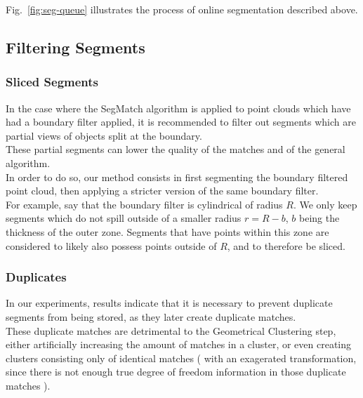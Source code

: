 Fig.~\ref{fig:seg-queue} illustrates the process of online segmentation described above.
\subsection{Filtering Segments}

\label{subsec:filtering-segments}

\subsubsection{Sliced Segments}
\label{subsub:sec:sliced}

In the case where the SegMatch algorithm is applied to point clouds which have had a boundary filter applied, it is recommended to filter out segments which are partial views of objects split at the boundary.\\

These partial segments can lower the quality of the matches and of the general algorithm.\\

In order to do so, our method consists in first segmenting the boundary filtered point cloud, then applying a stricter version of the same boundary filter.\\

For example, say that the boundary filter is cylindrical of radius $R$. We only keep segments which do not spill outside of a smaller radius $r = R-b$, $b$ being the thickness of the outer zone. Segments that have points within this zone are considered to likely also possess points outside of $R$, and to therefore be sliced.\\

\subsubsection{Duplicates}
\label{subsub:sec:duplicates}

In our experiments, results indicate that it is necessary to prevent duplicate segments from being stored, as they later create duplicate matches.\\ 

These duplicate matches are detrimental to the Geometrical Clustering step, either artificially increasing the amount of matches in a cluster, or even creating clusters consisting only of identical matches ( with an exagerated transformation, since there is not enough true degree of freedom information in those duplicate matches ).


